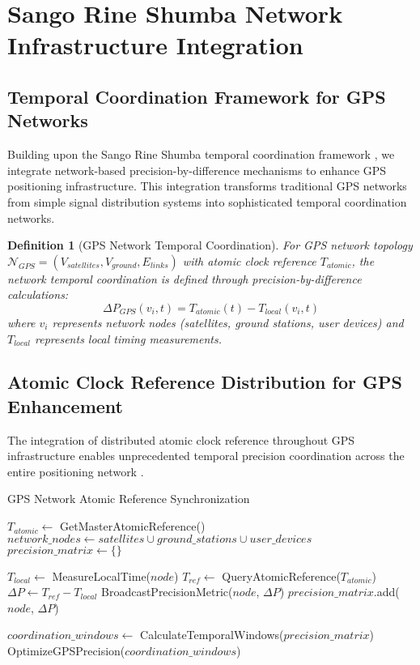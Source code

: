 \documentclass[12pt,a4paper]{article}
\newtheorem{definition}[theorem]{Definition}
\begin{document}
\section{Sango Rine Shumba Network Infrastructure Integration}

\subsection{Temporal Coordination Framework for GPS Networks}

Building upon the Sango Rine Shumba temporal coordination framework \cite{sachikonye2025sango}, we integrate network-based precision-by-difference mechanisms to enhance GPS positioning infrastructure. This integration transforms traditional GPS networks from simple signal distribution systems into sophisticated temporal coordination networks.

\begin{definition}[GPS Network Temporal Coordination]
For GPS network topology $\mathcal{N}_{GPS} = (V_{satellites}, V_{ground}, E_{links})$ with atomic clock reference $T_{atomic}$, the network temporal coordination is defined through precision-by-difference calculations:
\begin{equation}
\Delta P_{GPS}(v_i, t) = T_{atomic}(t) - T_{local}(v_i, t)
\end{equation}
where $v_i$ represents network nodes (satellites, ground stations, user devices) and $T_{local}$ represents local timing measurements.
\end{definition}

\subsection{Atomic Clock Reference Distribution for GPS Enhancement}

The integration of distributed atomic clock reference throughout GPS infrastructure enables unprecedented temporal precision coordination across the entire positioning network \cite{mills1991ntp,lamport1978time}.

\begin{algorithm}
\caption{GPS Network Atomic Reference Synchronization}
\begin{algorithmic}[1]
    \State $T_{atomic} \gets$ GetMasterAtomicReference()
    \State $network\_nodes \gets satellites \cup ground\_stations \cup user\_devices$
    \State $precision\_matrix \gets \{\}$
    
        \State $T_{local} \gets$ MeasureLocalTime($node$)
        \State $T_{ref} \gets$ QueryAtomicReference($T_{atomic}$)
        \State $\Delta P \gets T_{ref} - T_{local}$
        \State BroadcastPrecisionMetric($node$, $\Delta P$)
        \State $precision\_matrix$.add($node$, $\Delta P$)
    \EndFor
    
    \State $coordination\_windows \gets$ CalculateTemporalWindows($precision\_matrix$)
    \State \Return OptimizeGPSPrecision($coordination\_windows$)
\EndProcedure
\end{algorithmic}
\end{algorithm}
\end{document}
